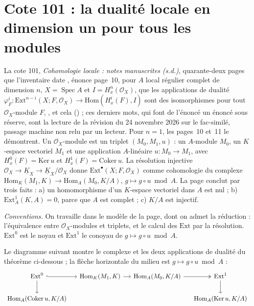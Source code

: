 \section[Cote 101 : la dualité locale en dimension un pour tous les modules]{Cote 101 : la dualité locale en dimension un pour tous les modules\protect{}}\label{sec:101}

La cote 101, \emph{Cohomologie locale : notes manuscrites (s.d.)}, quarante-deux pages que l'inventaire date \q{[à partir de 1967-1968]}, énonce page~10, pour $A$ local régulier complet de dimension $n$, $X = \operatorname{Spec} A$ et $I = H^n_x(\mathcal O_X)$, que les applications de dualité $\varphi^i_F : \mathrm{Ext}^{n-i}(X; F, \mathcal O_X) \to \mathrm{Hom}(H^i_x(F), I)$ sont des isomorphismes pour tout $\mathcal O_X$-module $F$, , et cela  () ; ces derniers mots, qui font de l'énoncé un énoncé sous réserve, sont la lecture de la révision du 24 novembre 2026 sur le fac-similé, passage machine non relu par un lecteur. Pour $n = 1$, les pages~10 et~11 le démontrent. Un $\mathcal O_X$-module est un triplet $(M_0, M_1, u)$ : un $A$-module $M_0$, un $K$-espace vectoriel $M_1$ et une application $A$-linéaire $u : M_0 \to M_1$, avec $H^0_x(F) = \mathrm{Ker}\, u$ et $H^1_x(F) = \mathrm{Coker}\, u$. La résolution injective $\mathcal O_X \to \underline K_X \to \underline K_X/\mathcal O_X$ donne $\mathrm{Ext}^\bullet(X; F, \mathcal O_X)$ comme cohomologie du complexe $\mathrm{Hom}_K(M_1, K) \to \mathrm{Hom}_A(M_0, K/A)$, $g \mapsto g \circ u \bmod A$. La page conclut par trois faits : a) un homomorphisme d'un $K$-espace vectoriel dans $A$ est nul ; b) $\mathrm{Ext}^1_A(K, A) = 0$, parce que $A$ est complet ; c) $K/A$ est injectif.

\noindent\emph{Conventions.} On travaille dans le modèle de la page, dont on admet la réduction : l'équivalence entre $\mathcal O_X$-modules et triplets, et le calcul des $\mathrm{Ext}$ par la résolution. $\mathrm{Ext}^0$ est le noyau et $\mathrm{Ext}^1$ le conoyau de $g \mapsto g \circ u \bmod A$.

Le diagramme suivant montre le complexe et les deux applications de dualité du théorème ci-dessous ; la flèche horizontale du milieu est $g \mapsto g \circ u \bmod A$ :
\[
\begin{tikzcd}[column sep=small]
\mathrm{Ext}^0 \arrow[r, hook] \arrow[d] & \mathrm{Hom}_K(M_1, K) \arrow[r] & \mathrm{Hom}_A(M_0, K/A) \arrow[r, two heads] & \mathrm{Ext}^1 \arrow[d] \\
\mathrm{Hom}_A(\mathrm{Coker}\, u, K/A) & & & \mathrm{Hom}_A(\mathrm{Ker}\, u, K/A)
\end{tikzcd}
\]

